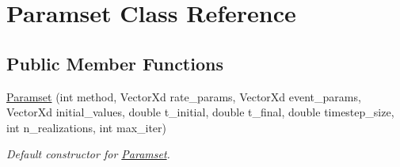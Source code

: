 \hypertarget{class_paramset}{}\section{Paramset Class Reference}
\label{class_paramset}
\subsection*{Public Member Functions}
\begin{DoxyCompactItemize}
\item 
\hyperlink{class_paramset_a2893c9f0d0ad896fd1f55d4cda734cbd}{Paramset} (int method, Vector\+Xd rate\+\_\+params, Vector\+Xd event\+\_\+params, Vector\+Xd initial\+\_\+values, double t\+\_\+initial, double t\+\_\+final, double timestep\+\_\+size, int n\+\_\+realizations, int max\+\_\+iter)
\begin{DoxyCompactList}\small\item\em Default constructor for \hyperlink{class_paramset}{Paramset}. \end{DoxyCompactList}\end{DoxyCompactItemize}
